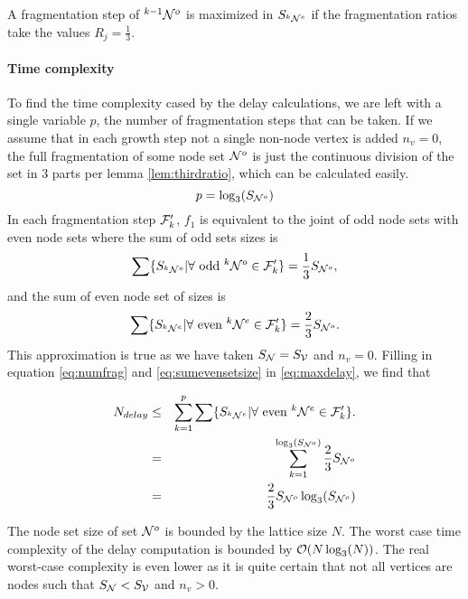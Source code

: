 \begin{lemma}\label{lem:thirdratio}
  A fragmentation step of ${}^{k-1}\mathcal{N}^o$ is maximized in $S_{{}^{k}\mathcal{N}^e}$ if the fragmentation ratios take the values $R_j = \frac{1}{3}$.
\end{lemma}

\paragraph{Time complexity}

To find the time complexity cased by the delay calculations, we are left with a single variable $p$, the number of fragmentation steps that can be taken. If we assume that in each growth step not a single non-node vertex is added $n_v = 0$, the full fragmentation of some node set $\mathcal{N}^o$ is just the continuous division of the set in 3 parts per lemma \ref{lem:thirdratio}, which can be calculated easily.
\begin{equation}\label{eq:numfrag}
  p = \log_3(S_{\mathcal{N}^o})
\end{equation}
In each fragmentation step $\mathcal{F}'_k$, $f_1$ is equivalent to the joint of odd node sets with even node sets where the sum of odd sets sizes is
\begin{equation}\label{eq:sumoddsetsize}
  \sum \{ S_{{}^{k}\mathcal{N}^o} | \forall \mbox{ odd } {}^{k}\mathcal{N}^o \in \mathcal{F}'_k \} = \frac{1}{3}S_{\mathcal{N}^o},
\end{equation}
and the sum of even node set of sizes is
\begin{equation}\label{eq:sumevensetsize}
  \sum \{ S_{{}^{k}\mathcal{N}^e} | \forall \mbox{ even } {}^{k}\mathcal{N}^e \in \mathcal{F}'_k \} = \frac{2}{3}S_{\mathcal{N}^o}.
\end{equation}
This approximation is true as we have taken $S_{\mathcal{N}} = S_{\mathcal{V}}$ and $n_v=0$. Filling in equation \ref{eq:numfrag} and \ref{eq:sumevensetsize} in \ref{eq:maxdelay}, we find that

\begin{eqnarray}
\nonumber  N_{delay} &\leq& \sum_{k=1}^{p} \sum \{ S_{{}^{k}\mathcal{N}^e} | \forall \mbox{ even } {}^{k}\mathcal{N}^e \in \mathcal{F}'_k \}. \\
\nonumber   &=& \sum_{k=1}^{\log_3(S_{\mathcal{N}^o})} \frac{2}{3}S_{\mathcal{N}^o} \\
   &=& \frac{2}{3}S_{\mathcal{N}^o}\log_3(S_{\mathcal{N}^o})
\end{eqnarray}

The node set size of set $\mathcal{N}^o$ is bounded by the lattice size $N$. The worst case time complexity of the delay computation is bounded by $\mathcal{O}(N\log_3(N))$. The real worst-case complexity is even lower as it is quite certain that not all vertices are nodes such that $S_{\mathcal{N}} < S_{\mathcal{V}}$ and $n_v > 0$.

